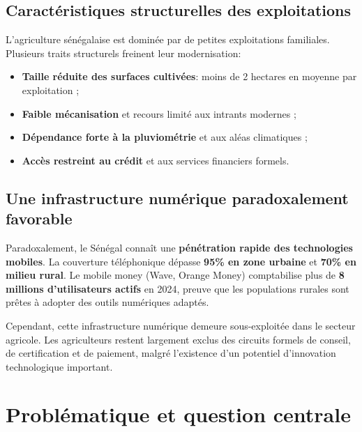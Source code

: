 \documentclass[12pt,a4paper]{report}
\begin{document}
\vspace{0.4cm}

\subsection{Caractéristiques structurelles des exploitations}

\noindent
L'agriculture sénégalaise est dominée par de petites exploitations familiales. Plusieurs traits structurels freinent leur modernisation:
\begin{itemize}
  \item \textbf{Taille réduite des surfaces cultivées}: moins de 2 hectares en moyenne par exploitation ;
  \item \textbf{Faible mécanisation} et recours limité aux intrants modernes ;
  \item \textbf{Dépendance forte à la pluviométrie} et aux aléas climatiques ;
  \item \textbf{Accès restreint au crédit} et aux services financiers formels.
\end{itemize}

\vspace{0.4cm}

\subsection{Une infrastructure numérique paradoxalement favorable}

\noindent
Paradoxalement, le Sénégal connaît une \textbf{pénétration rapide des technologies mobiles}. La couverture téléphonique dépasse \textbf{95\% en zone urbaine} et \textbf{70\% en milieu rural}. Le mobile money (Wave, Orange Money) comptabilise plus de \textbf{8 millions d'utilisateurs actifs} en 2024, preuve que les populations rurales sont prêtes à adopter des outils numériques adaptés.

\vspace{0.4cm}

\noindent
Cependant, cette infrastructure numérique demeure sous-exploitée dans le secteur agricole. Les agriculteurs restent largement exclus des circuits formels de conseil, de certification et de paiement, malgré l'existence d'un potentiel d'innovation technologique important.

\vspace{0.5cm}

\section{Problématique et question centrale}
\end{document}
